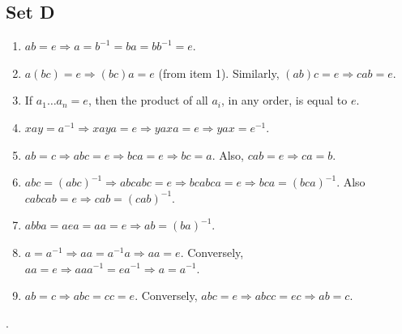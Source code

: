 \documentclass{article}
\begin{document}
\subsection{Set D}
\begin{enumerate}
    \item $ab = e \Rightarrow a = b^{-1} = ba = bb^{-1} = e$.
    \item $a(bc) = e \Rightarrow (bc)a = e$ (from item 1). Similarly, $(ab)c = e \Rightarrow cab = e$.
    \item If $a_1\ldots a_n = e$, then the product of all $a_i$, in any order, is equal to $e$.
    \item $xay = a^{-1} \Rightarrow xaya = e \Rightarrow yaxa = e \Rightarrow yax = e^{-1}$.
    \item $ab = c \Rightarrow abc = e \Rightarrow bca = e \Rightarrow bc = a$. Also, $cab = e \Rightarrow ca = b$.
    \item $abc = (abc)^{-1} \Rightarrow abcabc = e \Rightarrow bcabca = e \Rightarrow bca = (bca)^{-1}$. Also $cabcab = e \Rightarrow cab = (cab)^{-1}$.
    \item $abba = aea = aa = e \Rightarrow ab = (ba)^{-1}$.
    \item $a = a^{-1} \Rightarrow aa = a^{-1}a \Rightarrow aa = e$. Conversely, $aa = e \Rightarrow aaa^{-1} = ea^{-1} \Rightarrow a = a^{-1}$.
    \item $ab = c \Rightarrow abc = cc = e$. Conversely, $abc = e \Rightarrow abcc = ec \Rightarrow ab = c$.
\end{enumerate}.
\end{document}
